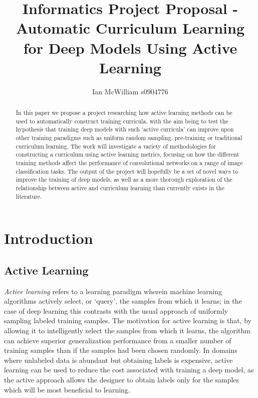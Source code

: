 \documentclass[a4paper,10.5pt]{article}
\begin{document}
\title{Informatics Project Proposal - Automatic Curriculum Learning for Deep Models Using Active Learning}
\author{Ian McWilliam s0904776}
\date{}
\maketitle

\begin{abstract}
In this paper we propose a project researching how active learning methods can be used to automatically construct training curricula, with the aim being to test the hypothesis that training deep models with such `active curricula' can improve upon other training paradigms such as uniform random sampling, pre-training or traditional curriculum learning. The work will investigate a variety of methodologies for constructing a curriculum using active learning metrics, focusing on how the different training methods affect the performance of convolutional networks on a range of image classification tasks. The output of the project will hopefully be a set of novel ways to improve the training of deep models, as well as a more thorough exploration of the relationship between active and curriculum learning than currently exists in the literature.
\end{abstract}

\newpage

\section{Introduction}

\subsection*{Active Learning}
\textit{Active learning} refers to a learning paradigm wherein machine learning algorithms actively select, or `query', the samples from which it learns; in the case of deep learning this contrasts with the usual approach of uniformly sampling labeled training samples. The motivation for active learning is that, by allowing it to intelligently select the samples from which it learns, the algorithm can achieve superior generalization performance from a smaller number of training samples than if the samples had been chosen randomly. In domains where unlabeled data is abundant but obtaining labels is expensive, active learning can be used to reduce the cost associated with training a deep model, as the active approach allows the designer to obtain labels only for the samples which will be most beneficial to learning.
\end{document}
